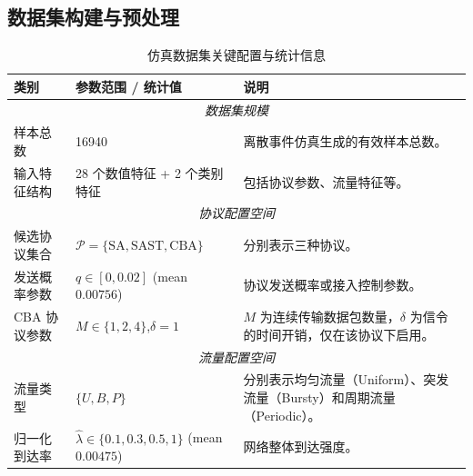 
\subsection{数据集构建与预处理}
\label{subsec:dataset_construction}


\begin{table}[t]
\centering
\caption{仿真数据集关键配置与统计信息}
\label{tab:dataset_summary}
\renewcommand{\arraystretch}{1.25}
\setlength{\tabcolsep}{5.5pt}
\small
\begin{tabular}{@{}p{2.7cm} p{6cm} p{6.5cm}@{}}
\toprule
\textbf{类别} & \textbf{参数范围 / 统计值} & \textbf{说明} \\
\midrule

\multicolumn{3}{c}{\textit{数据集规模}} \\

样本总数 
& 16940 
& 离散事件仿真生成的有效样本总数。 \\

输入特征结构 
& 28 个数值特征 + 2 个类别特征 
& 包括协议参数、流量特征等。 \\


\midrule
\multicolumn{3}{c}{\textit{协议配置空间}} \\

候选协议集合 
& $\mathcal{P}=\{\mathrm{SA},\mathrm{SAST},\mathrm{CBA}\}$ 
& 分别表示三种协议。 \\

发送概率参数 
& $q\in[0,0.02]$ \quad (mean $0.00756$) 
& 协议发送概率或接入控制参数。 \\

CBA 协议参数 
& $M\in\{1,2,4\}$,\quad $\delta=1$ 
& $M$ 为连续传输数据包数量，$\delta$ 为信令的时间开销，仅在该协议下启用。 \\

\midrule
\multicolumn{3}{c}{\textit{流量配置空间}} \\

流量类型 
& $\{U,B,P\}$ 
& 分别表示均匀流量（Uniform）、突发流量（Bursty）和周期流量（Periodic）。 \\

归一化到达率 
& $\hat{\lambda}\in\{0.1,0.3,0.5,1\}$ \quad (mean $0.00475$) 
& 网络整体到达强度。 \\



\end{tabular}
\end{table}
